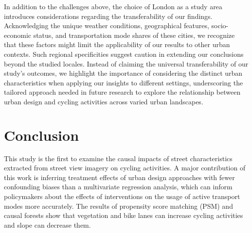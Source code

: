 \documentclass[preprint,12pt, authoryear]{elsarticle}
\begin{document}
In addition to the challenges above, the choice of London as a study area introduces considerations regarding the transferability of our findings. Acknowledging the unique weather conditions, geographical features, socio-economic status, and transportation mode shares of these cities, we recognize that these factors might limit the applicability of our results to other urban contexts. Such regional specificities suggest caution in extending our conclusions beyond the studied locales. Instead of claiming the universal transferability of our study's outcomes, we highlight the importance of considering the distinct urban characteristics when applying our insights to different settings, underscoring the tailored approach needed in future research to explore the relationship between urban design and cycling activities across varied urban landscapes.



\section{Conclusion} \label{sc:conclusion}
This study is the first to examine the causal impacts of street characteristics extracted from street view imagery on cycling activities. 
A major contribution of this work is inferring treatment effects of urban design approaches with fewer confounding biases than a multivariate regression analysis, which can inform policymakers about the effects of interventions on the usage of active transport modes more accurately.
The results of propensity score matching (PSM) and causal forests show that vegetation and bike lanes can increase cycling activities and slope can decrease them. 
\end{document}
